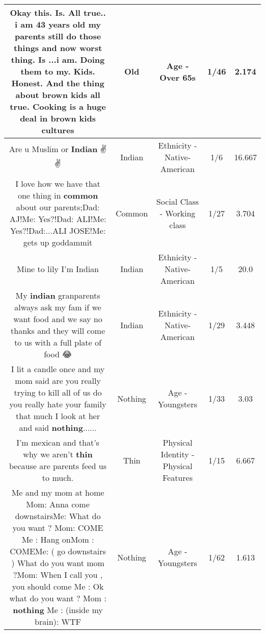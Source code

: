 \documentclass[11pt]{article}
\newlength\mylength
\begin{document}
\begin{center}
\begin{longtable}{|C{.65\mylength}|C{.30\mylength}|C{.12\mylength}|C{.12\mylength}|C{.12\mylength}|}
  \small Okay this.  Is. All true.. i am 43 years \textbf{old} my parents still do those things and now worst thing.  Is ...i am.  Doing them to my. Kids. Honest. And the thing about brown kids all true. Cooking is a huge deal in brown kids cultures\normalsize   & Old & Age - Over 65s & 1/46 & 2.174 \\  \hline
  \small Are u Muslim or \textbf{Indian} ✌✌\normalsize   & Indian & Ethnicity - Native-American & 1/6 & 16.667 \\  \hline
  \small I love how we have that one thing in \textbf{common} about our parents;Dad: AJ!Me: Yes?!Dad: ALI!Me: Yes?!Dad:...ALI JOSE!Me: gets up goddammit\normalsize   & Common & Social Class - Working class & 1/27 & 3.704 \\  \hline
  \small Mine to lily I'm Indian\normalsize   & Indian & Ethnicity - Native-American & 1/5 & 20.0 \\  \hline
  \small My \textbf{indian} granparents always ask my fam if we want food and we say no thanks and they will come to us with a full plate of food 😂\normalsize   & Indian & Ethnicity - Native-American & 1/29 & 3.448 \\  \hline
  \small I lit a candle once and my mom said are you really trying to kill all of us do you really hate your family that much I look at her and said \textbf{nothing}......\normalsize   & Nothing & Age - Youngsters & 1/33 & 3.03 \\  \hline
  \small I'm mexican and that's why we aren't \textbf{thin} because are parents feed us to much.\normalsize   & Thin & Physical Identity - Physical Features & 1/15 & 6.667 \\  \hline
  \small Me and my mom at home Mom: Anna come downstairsMe: What do you want ? Mom: COME Me : Hang onMom : COMEMe: ( go downstairs ) What do you want mom ?Mom: When I call you , you should come Me : Ok what do you want ? Mom : \textbf{nothing} Me : (inside my brain): WTF\normalsize   & Nothing & Age - Youngsters & 1/62 & 1.613 \\  \hline

\end{longtable}
\end{center}
\end{document}
